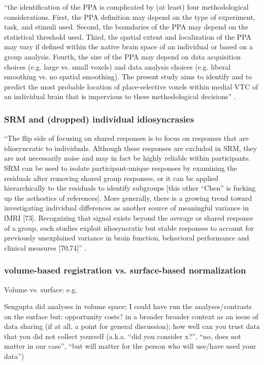 ``the identification of the PPA is complicated by (at least) four
methodological considerations. First, the PPA definition may depend on the type
of experiment, task, and stimuli used. Second, the boundaries of the PPA may
depend on the statistical threshold used. Third, the spatial extent and
localization of the PPA may vary if defined within the native brain space of an
individual or based on a group analysis. Fourth, the size of the PPA may depend
on data acquisition choices (e.g. large vs. small voxels) and data analysis
choices (e.g. liberal smoothing vs. no spatial smoothing). The present study
aims to identify and to predict the most probable location of place-selective
voxels within medial VTC of an individual brain that is impervious to these
methodological decisions'' \citep{weiner2018defining}.


\subsubsection{SRM and (dropped) individual idiosyncrasies}

``The flip side of focusing on shared responses is to focus on responses that
are idiosyncratic to individuals.
%
Although these responses are excluded in SRM, they are not necessarily noise and
may in fact be highly reliable within participants.
%
SRM can be used to isolate participant-unique responses by examining the
residuals after removing shared group responses, or it can be applied
hierarchically to the residuals to identify subgroups \citep{chen2017shared}
\citep{cohen2017computational} [this other ``Chen'' is fucking up the aethestics
of references].
%
More generally, there is a growing trend toward investigating individual
differences as another source of meaningful variance in fMRI [73].
%
Recognizing that signal exists beyond the average or shared response of a group,
such studies exploit idiosyncratic but stable responses to account for
previously unexplained variance in brain function, behavioral performance and
clinical measures [70,74]'' \citep{cohen2017computational}.


\subsubsection{volume-based registration vs. surface-based normalization}
%
Volume vs. surface: e.g. \citep{desai2005volumetric}

Sengupta did analyses in volume space;
%
I could have run the analyses/contrasts on the surface
%
but: opportunity costs?
%
in a broader broader context as an issue of data sharing (if at all, a point for
general discussion); how well can you trust data that you did not collect
yourself (a.k.a. ``did you consider x?'', ``no, does not matter in our case'',
``but will matter for the person who will use/have used your data'')

